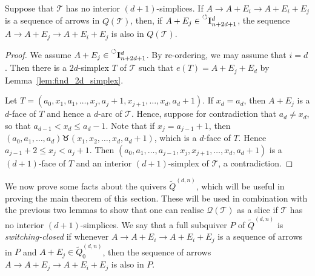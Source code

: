 \documentclass[ALCO,Unicode,published]{cedram}
\newcommand{\nonconsec}[2]{\prescript{\circlearrowleft}{}{\mathbf{I}_{#1}^{#2}}}
\newcommand{\tqdn}{\tilde{Q}^{(d, n)}}
\newcommand{\swr}{\taurus} %
\begin{document}
\begin{lemma}\label{lem:simp_arrow_switch}
Suppose that $\mathcal{T}$ has no interior $(d+1)$-simplices. If $A \rightarrow A + E_{i} \rightarrow A + E_{i} + E_{j}$ is a sequence of arrows in $Q(\mathcal{T})$, then, if $A + E_{j} \in \nonconsec{n+2d+1}{d}$, the sequence $A \rightarrow A + E_{j} \rightarrow A + E_{i} + E_{j}$ is also in $Q(\mathcal{T})$.
\end{lemma}
\begin{proof}
We assume $A + E_{j} \in \nonconsec{n+2d+1}{d}$. By re-ordering, we may assume that $i = d$. Then there is a $2d$-simplex $T$ of $\mathcal{T}$ such that $e(T) = A + E_{j} + E_{d}$ by Lemma~\ref{lem:find_2d_simplex}.

Let $T = (a_{0}, x_{1}, a_{1}, \dots, x_{j}, a_{j} + 1, x_{j + 1}, \dots, x_{d}, a_{d} + 1)$. If $x_{d} = a_{d}$, then $A + E_{j}$ is a $d$-face of $T$ and hence a $d$-arc of $\mathcal{T}$. Hence, suppose for contradiction that $a_{d} \neq x_{d}$, so that $a_{d - 1} < x_{d} \leqslant a_{d} - 1$. Note that if $x_{j} = a_{j - 1} + 1$, then $(a_{0}, a_{1}, \dots , a_{d}) \swr (x_{1}, x_{2}, \dots ,x_{d}, a_{d} + 1)$, which is a $d$-face of $T$. Hence $a_{j - 1} + 2 \leqslant x_{j} < a_{j} + 1$. Then $(a_{0}, a_{1}, \dots, a_{j - 1}, x_{j}, x_{j + 1}, \dots , x_{d}, a_{d} + 1)$ is a $(d + 1)$-face of $T$ and an interior $(d+1)$-simplex of $\mathcal{T}$, a contradiction.
\end{proof}

We now prove some facts about the quivers $\tqdn$, which will be useful in proving the main theorem of this section. These will be used in combination with the previous two lemmas to show that one can realise $\mathcal{Q}(\mathcal{T})$ as a slice if $\mathcal{T}$ has no interior $(d + 1)$-simplices. We say that a full subquiver $P$ of $\tqdn$ is \emph{switching-closed} if whenever $A \rightarrow A + E_{i} \rightarrow A + E_{i} + E_{j}$ is a sequence of arrows in $P$ and $A + E_{j} \in \tqdn_{0}$, then the sequence of arrows $A \rightarrow A + E_{j} \rightarrow A + E_{i} + E_{j}$ is also in $P$.
\end{document}
